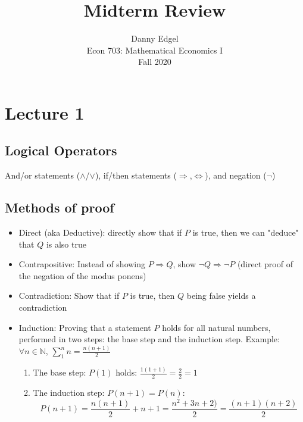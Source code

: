 \documentclass{article}
\newcommand{\N}{\mathbb{N}}
\begin{document}
\title{Midterm Review}
\author{ 	Danny Edgel 							\\ 
			Econ 703: Mathematical Economics I		\\
			Fall 2020								\\
		}
\maketitle\thispagestyle{empty}



\section{Lecture 1}

\subsection{Logical Operators}
And/or statements ($\land$/$\lor$), if/then statements ($\Rightarrow$,$\iff$), and negation ($\neg$)

\subsection{Methods of proof}
\begin{itemize}
	\item Direct (aka Deductive): directly show that if $P$ is true, then we can "deduce" that $Q$ is also true
	
	\item Contrapositive: Instead of showing $P\Rightarrow Q$, show $\neg Q\Rightarrow\neg P$ (direct proof of the negation of the modus ponens)
	
	\item Contradiction: Show that if $P$ is true, then $Q$ being false yields a contradiction
	
	\item Induction: Proving that a statement $P$ holds for all natural numbers, performed in two steps: the base step and the induction step. Example: $\forall n\in\N$, $\sum_1^n n=\frac{n(n+1)}{2}$
		\begin{enumerate}
			\item The base step: $P(1)$ holds: $\frac{1(1+1)}{2}=\frac{2}{2}=1$
			\item The induction step: $P(n+1)=P(n)$: 
				\[
					P(n+1)=\frac{n(n+1)}{2}+n+1=\frac{n^2+3n+2)}{2}=\frac{(n+1)(n+2)}{2}
				\]
		\end{enumerate}
\end{itemize}
\end{document}
